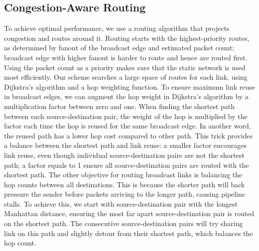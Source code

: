 \subsection{Congestion-Aware Routing} \label{sec:route}
To achieve optimal performance, we use a routing algorithm that projects congestion and routes around it. 
Routing starts with the highest-priority routes, as determined by fanout of the broadcast edge and
estimated packet count; broadcast edge with higher fanout is harder to route and hence are routed
first.
Using the packet count as a priority makes sure that the static network is used most efficiently.
Our scheme searches a large space of routes for each link, using Dijkstra's algorithm \cite{dijkstra} and a hop weighting function.
To ensure maximum link reuse in broadcast edges, we can augment the hop weight in Dijkstra's
algorithm by a multiplication factor between zero and one. 
When finding the shortest path between each source-destination pair, the weight of the hop is
multiplied by the factor each time the hop is reused for the same broadcast edge.
In another word, the reused path has a lower hop cost compared to other path.
This trick provides a balance between the shortest path and link reuse: a smaller factor encourages link
reuse, even though individual source-destination pairs are not the shortest path; a factor equals to
1 ensure all source-destination pairs are routed with the shortest path.
The other objective for routing broadcast links is balancing the hop counts between all
destinations. This is because the shorter path will back pressure the sender before packets arriving
to the longer path, causing pipeline stalls.
To achieve this, we start with source-destination pair with the longest Manhattan distance, ensuring
the most far apart source-destination pair is routed on the shortest path.
The consecutive source-destination pairs will try sharing link on this path and slightly detour from
their shortest path, which balances the hop count.

